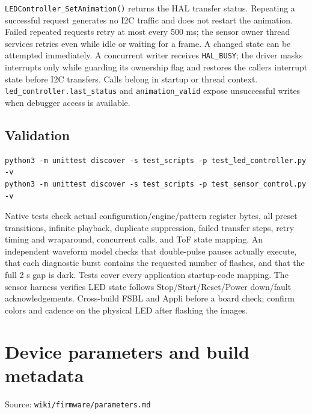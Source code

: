 \documentclass[10pt,a4paper,oneside]{report}
\begin{document}
\texttt{LEDController\_\allowbreak{}SetAnimation()} returns the HAL transfer status. Repeating a successful request generates no I2C traffic and does not restart the animation. Failed repeated requests retry at most every 500 ms; the sensor owner thread services retries even while idle or waiting for a frame. A changed state can be attempted immediately. A concurrent writer receives \texttt{HAL\_\allowbreak{}BUSY}; the driver masks interrupts only while guarding its ownership flag and restores the caller\textquotesingle s interrupt state before I2C transfers. Calls belong in startup or thread context. \texttt{led\_\allowbreak{}controller.\allowbreak{}last\_\allowbreak{}status} and \texttt{animation\_\allowbreak{}valid} expose unsuccessful writes when debugger access is available.

\section{Validation}\label{wiki-firmware-status-led--validation}

\begin{verbatim}
python3 -m unittest discover -s test_scripts -p test_led_controller.py -v
python3 -m unittest discover -s test_scripts -p test_sensor_control.py -v
\end{verbatim}

Native tests check actual configuration/engine/pattern register bytes, all preset transitions, infinite playback, duplicate suppression, failed transfer steps, retry timing and wraparound, concurrent calls, and ToF state mapping. An independent waveform model checks that double-pulse pauses actually execute, that each diagnostic burst contains the requested number of flashes, and that the full 2 s gap is dark. Tests cover every application startup-code mapping. The sensor harness verifies LED state follows Stop/Start/Reset/Power down/fault acknowledgements. Cross-build FSBL and Appli before a board check; confirm colors and cadence on the physical LED after flashing the images.

\chapter{Device parameters and build metadata}\label{wiki-firmware-parameters--device-parameters-and-build-metadata}

{\small\color{MGSMuted}Source: \nolinkurl{wiki/firmware/parameters.md}\par}\medskip
\end{document}
